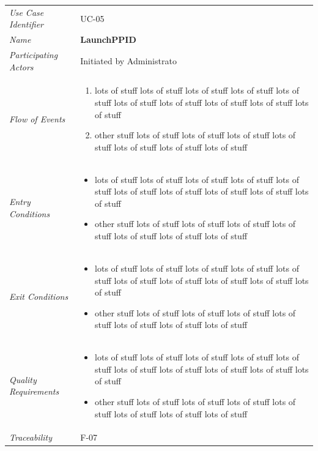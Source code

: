 \documentclass[12pt,letterpaper]{article}
\begin{document}
\begin{center}
	\begin{tabu} to 
		\toprule
		Use Case Identifier & UC-05 \\
		Name & {\bf LaunchPPID} \\
		Participating Actors & Initiated by Administrato \\
		Flow of Events & 
	    \begin{enumerate}[topsep=-1em]
		    \item lots of stuff lots of stuff lots of stuff lots of stuff lots of stuff lots of stuff lots of stuff lots of stuff lots of stuff lots of stuff
		    \item other stuff lots of stuff lots of stuff lots of stuff lots of stuff lots of stuff lots of stuff lots of stuff
		\end{enumerate} \\

		Entry Conditions &
		\begin{itemize}[topsep=-1em]
		    \item lots of stuff lots of stuff lots of stuff lots of stuff lots of stuff lots of stuff lots of stuff lots of stuff lots of stuff lots of stuff
		    \item other stuff lots of stuff lots of stuff lots of stuff lots of stuff lots of stuff lots of stuff lots of stuff
        \end{itemize} \\

		Exit Conditions &
		\begin{itemize}[topsep=-1em]
		    \item lots of stuff lots of stuff lots of stuff lots of stuff lots of stuff lots of stuff lots of stuff lots of stuff lots of stuff lots of stuff
		    \item other stuff lots of stuff lots of stuff lots of stuff lots of stuff lots of stuff lots of stuff lots of stuff
        \end{itemize} \\

		Quality Requirements &
		\begin{itemize}[topsep=-1em]
		    \item lots of stuff lots of stuff lots of stuff lots of stuff lots of stuff lots of stuff lots of stuff lots of stuff lots of stuff lots of stuff
		    \item other stuff lots of stuff lots of stuff lots of stuff lots of stuff lots of stuff lots of stuff lots of stuff
        \end{itemize} \\

		Traceability & F-07 \\
		\toprule
	\end{tabu}
\end{center}
\end{document}
